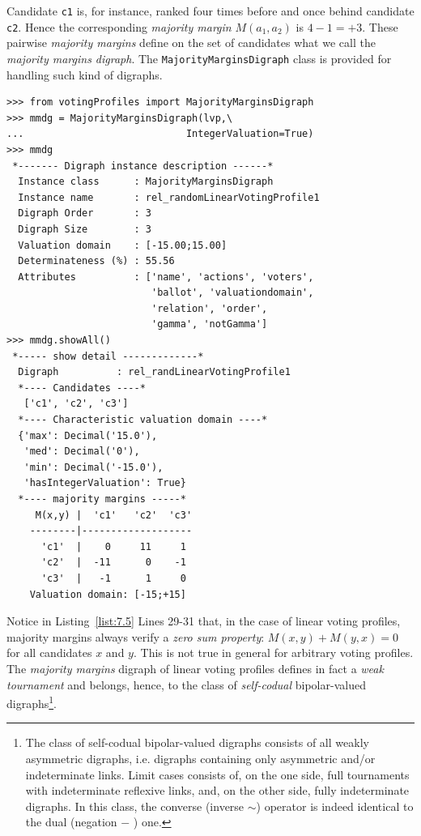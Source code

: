 Candidate \texttt{c1} is, for instance, ranked four times before and once behind candidate \texttt{c2}. Hence the corresponding \emph{majority margin} $M(a_1,a_2)$ is $4 - 1 = +3$. These pairwise \emph{majority margins} define on the set of candidates what we call the \emph{majority margins digraph}. The \texttt{MajorityMarginsDigraph} class is provided for handling such kind of digraphs.
\begin{lstlisting}[caption={Example of \emph{Majority Margins} digraph},label=list:7.5]
>>> from votingProfiles import MajorityMarginsDigraph
>>> mmdg = MajorityMarginsDigraph(lvp,\
...                            IntegerValuation=True)
>>> mmdg
 *------- Digraph instance description ------*
  Instance class      : MajorityMarginsDigraph
  Instance name       : rel_randomLinearVotingProfile1
  Digraph Order       : 3
  Digraph Size        : 3
  Valuation domain    : [-15.00;15.00]
  Determinateness (%) : 55.56
  Attributes          : ['name', 'actions', 'voters',
                         'ballot', 'valuationdomain',
                         'relation', 'order',
                         'gamma', 'notGamma']
>>> mmdg.showAll()
 *----- show detail -------------*
  Digraph          : rel_randLinearVotingProfile1
  *---- Candidates ----*
   ['c1', 'c2', 'c3']
  *---- Characteristic valuation domain ----*
  {'max': Decimal('15.0'),
   'med': Decimal('0'),
   'min': Decimal('-15.0'),
   'hasIntegerValuation': True}
  *---- majority margins -----*
     M(x,y) |  'c1'   'c2'  'c3'	  
    --------|-------------------
      'c1'  |    0     11     1	 
      'c2'  |  -11      0    -1	 
      'c3'  |   -1      1     0	 
    Valuation domain: [-15;+15]
\end{lstlisting}

Notice in Listing~\vref{list:7.5} Lines 29-31 that, in the case of linear voting profiles, majority margins always verify a \emph{zero sum property}: $M(x,y) + M(y,x) = 0$ for all candidates $x$ and $y$. This is not true in general for arbitrary voting profiles. The \emph{majority margins} digraph of linear voting profiles defines in fact a \emph{weak tournament} and belongs, hence, to the class of \emph{self-codual} bipolar-valued digraphs\footnote{The class of self-codual bipolar-valued digraphs consists of all weakly asymmetric digraphs, i.e. digraphs containing only asymmetric and/or indeterminate links. Limit cases consists of, on the one side, full tournaments with indeterminate reflexive links, and, on the other side, fully indeterminate digraphs. In this class, the converse (inverse $\sim$) operator is indeed identical to the dual (negation $-$ ) one.}.
    
